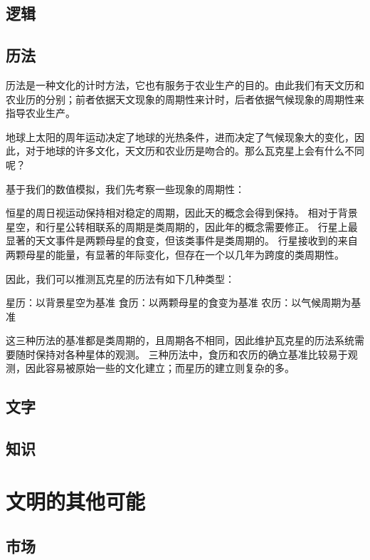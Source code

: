 \documentclass[a4paper,10.5pt]{book}
\begin{document}
\section{逻辑}

\section{历法}

历法是一种文化的计时方法，它也有服务于农业生产的目的。由此我们有天文历和农业历的分别；前者依据天文现象的周期性来计时，后者依据气候现象的周期性来指导农业生产。

地球上太阳的周年运动决定了地球的光热条件，进而决定了气候现象大的变化，因此，对于地球的许多文化，天文历和农业历是吻合的。那么瓦克星上会有什么不同呢？

基于我们的数值模拟，我们先考察一些现象的周期性：

恒星的周日视运动保持相对稳定的周期，因此天的概念会得到保持。
相对于背景星空，和行星公转相联系的周期是类周期的，因此年的概念需要修正。
行星上最显著的天文事件是两颗母星的食变，但该类事件是类周期的。
行星接收到的来自两颗母星的能量，有显著的年际变化，但存在一个以几年为跨度的类周期性。

因此，我们可以推测瓦克星的历法有如下几种类型：

星历：以背景星空为基准
食历：以两颗母星的食变为基准
农历：以气候周期为基准

这三种历法的基准都是类周期的，且周期各不相同，因此维护瓦克星的历法系统需要随时保持对各种星体的观测。
三种历法中，食历和农历的确立基准比较易于观测，因此容易被原始一些的文化建立；而星历的建立则复杂的多。

\section{文字}

\section{知识}



\chapter{文明的其他可能}

\section{市场}
\end{document}
